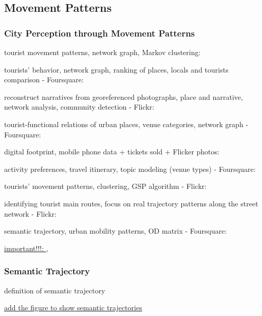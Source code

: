 \documentclass{article}
\begin{document}
\subsection{Movement Patterns}

\subsubsection{City Perception through Movement Patterns}

tourist movement patterns, network graph, Markov clustering: \cite{hu_graph-based_2019}

tourists' behavior, network graph, ranking of places, locals and tourists comparison - Foursquare: \cite{ferreira_beyond_2015}

reconstruct narratives from georeferenced photographs, place and narrative, network analysis, community detection - Flickr: \cite{straumann_towards_2014}

tourist-functional relations of urban places, venue categories, network graph - Foursquare: \cite{yang_identifying_2021}

digital footprint, mobile phone data + tickets sold + Flicker photos: \cite{girardin_digital_2008}

activity preferences, travel itinerary, topic modeling (venue types) - Foursquare: \cite{vu_discovering_2019}

tourists' movement patterns, clustering, GSP algorithm - Flickr: \cite{hopken_flickr_2020}

identifying tourist main routes, focus on real trajectory patterns along the street network - Flickr: \cite{mohino_identifying_2018}


semantic trajectory, urban mobility patterns, OD matrix - Foursquare: \cite{nin_tweets_2014}


\underline{important!!!: \cite{parent_semantic_2013}, \cite{yan_semantic_2013}}

\subsubsection{Semantic Trajectory}
definition of semantic trajectory

\underline{add the figure to show semantic trajectories}
\end{document}
